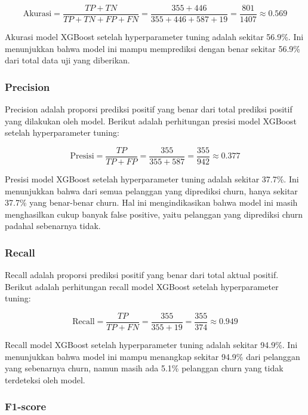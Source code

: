 \begin{equation}
    \text{Akurasi} = \frac{TP + TN}{TP + TN + FP + FN} = \frac{355 + 446}{355 + 446 + 587 + 19} = \frac{801}{1407} \approx 0.569
\end{equation}

Akurasi model XGBoost setelah hyperparameter tuning adalah sekitar 56.9\%. Ini menunjukkan bahwa model ini mampu memprediksi dengan benar sekitar 56.9\% dari total data uji yang diberikan.

\subsubsection*{Precision}

Precision adalah proporsi prediksi positif yang benar dari total prediksi positif yang dilakukan oleh model. Berikut adalah perhitungan presisi model XGBoost setelah hyperparameter tuning:

\begin{equation}
    \text{Presisi} = \frac{TP}{TP + FP} = \frac{355}{355 + 587} = \frac{355}{942} \approx 0.377
\end{equation}

Presisi model XGBoost setelah hyperparameter tuning adalah sekitar 37.7\%. Ini menunjukkan bahwa dari semua pelanggan yang diprediksi churn, hanya sekitar 37.7\% yang benar-benar churn. Hal ini mengindikasikan bahwa model ini masih menghasilkan cukup banyak false positive, yaitu pelanggan yang diprediksi churn padahal sebenarnya tidak.

\subsubsection*{Recall}

Recall adalah proporsi prediksi positif yang benar dari total aktual positif. Berikut adalah perhitungan recall model XGBoost setelah hyperparameter tuning:

\begin{equation}
    \text{Recall} = \frac{TP}{TP + FN} = \frac{355}{355 + 19} = \frac{355}{374} \approx 0.949
\end{equation}

Recall model XGBoost setelah hyperparameter tuning adalah sekitar 94.9\%. Ini menunjukkan bahwa model ini mampu menangkap sekitar 94.9\% dari pelanggan yang sebenarnya churn, namun masih ada 5.1\% pelanggan churn yang tidak terdeteksi oleh model.

\subsubsection*{F1-score}

